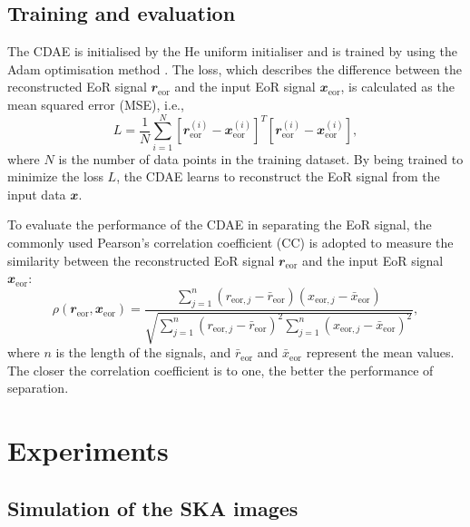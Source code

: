 \documentclass[fleqn,usenatbib]{mnras}
\newcommand{\R}[1]{\mathrm{#1}}
\newcommand{\B}[1]{\mathbfit{#1}}
\newcommand{\editwip}[1]{{\leavevmode\color{magenta}#1}}
\begin{document}
\subsection{Training and evaluation}
\label{sec:train-eval}

The CDAE is initialised by the He uniform initialiser \citep{he2015}
and is trained by using the Adam optimisation method \citep{kingma2015}.
The loss, which describes the difference between the reconstructed EoR
signal $\B{r}_{\R{eor}}$ and the input EoR signal $\B{x}_{\R{eor}}$,
is calculated as the mean squared error (MSE), i.e.,
\begin{equation}
  \label{eq:loss}
  L = \frac{1}{N} \sum_{i=1}^{N}
    \left[ \B{r}_{\R{eor}}^{(i)} - \B{x}_{\R{eor}}^{(i)} \right]^T
    \left[ \B{r}_{\R{eor}}^{(i)} - \B{x}_{\R{eor}}^{(i)} \right],
\end{equation}
where $N$ is the number of data points in the training dataset.
By being trained to minimize the loss $L$, the CDAE learns to
reconstruct the EoR signal from the input data $\B{x}$.

To evaluate the performance of the CDAE in separating the EoR signal,
the commonly used Pearson's correlation coefficient \editwip{(CC)}
\citep[e.g.,][]{harker2009,chapman2013}
is adopted to measure the similarity between the reconstructed EoR
signal $\B{r}_{\R{eor}}$ and the input EoR signal $\B{x}_{\R{eor}}$:
\begin{equation}
  \label{eq:corrcoef}
  \rho(\B{r}_{\R{eor}}, \B{x}_{\R{eor}})
      = \frac{\sum_{j=1}^{n}(r_{\R{eor},j} - \bar{r}_{\R{eor}})
      (x_{\R{eor},j} - \bar{x}_{\R{eor}})}{
        \sqrt{\sum_{j=1}^{n}(r_{\R{eor},j} - \bar{r}_{\R{eor}})^2
          \sum_{j=1}^{n}(x_{\R{eor},j} - \bar{x}_{\R{eor}})^2}
    },
\end{equation}
where $n$ is the length of the signals,
and $\bar{r}_{\R{eor}}$ and $\bar{x}_{\R{eor}}$ represent the mean values.
The closer the correlation coefficient is to one, the better the
performance of separation.


\section{Experiments}
\label{sec:experiments}

\subsection{Simulation of the SKA images}
\label{sec:simulation}
\end{document}
